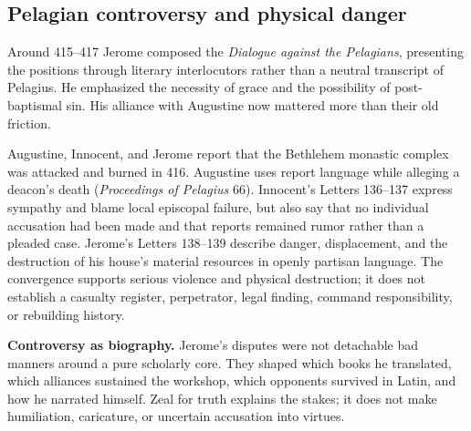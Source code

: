 \subsection{Pelagian controversy and physical danger}

Around 415--417 Jerome composed the \emph{Dialogue against the Pelagians}, presenting
the positions through literary interlocutors rather than a neutral transcript
of Pelagius. He emphasized the necessity of grace and the possibility of
post-baptismal sin. His alliance with Augustine now mattered more than their
old friction.

Augustine, Innocent, and Jerome report that the Bethlehem monastic complex was
attacked and burned in 416. Augustine uses report language while alleging a
deacon's death (\emph{Proceedings of Pelagius} 66). Innocent's Letters 136--137
express sympathy and blame local episcopal failure, but also say that no
individual accusation had been made and that reports remained rumor rather
than a pleaded case. Jerome's Letters 138--139 describe danger, displacement,
and the destruction of his house's material resources in openly partisan
language. The convergence supports serious violence and physical destruction;
it does not establish a casualty register, perpetrator, legal finding, command
responsibility, or rebuilding history.

\begin{studyframe}
\textbf{Controversy as biography.} Jerome's disputes were not detachable bad
manners around a pure scholarly core. They shaped which books he translated,
which alliances sustained the workshop, which opponents survived in Latin,
and how he narrated himself. Zeal for truth explains the stakes; it does not
make humiliation, caricature, or uncertain accusation into virtues.
\end{studyframe}
